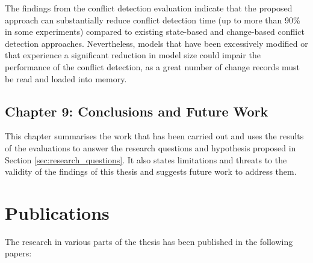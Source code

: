 The findings from the conflict detection evaluation indicate that the proposed approach can substantially reduce conflict detection time (up to more than 90\% in some experiments) compared to existing state-based and change-based conflict detection approaches. Nevertheless, models that have been excessively modified or that experience a significant reduction in model size could impair the performance of the conflict detection, as a great number of change records must be read and loaded into memory.

\subsection{Chapter 9: Conclusions and Future Work}
\label{sec:chapter_8_conclusions_and_future_work}
This chapter summarises the work that has been carried out and uses the results of the evaluations to answer the research questions and hypothesis proposed in Section \ref{sec:research_questions}. It also states limitations and threats to the validity of the findings of this thesis and suggests future work to address them.

\section{Publications}
\label{sec:publications}
The research in various parts of the thesis has been published in the following papers:
%  
%  
%  
